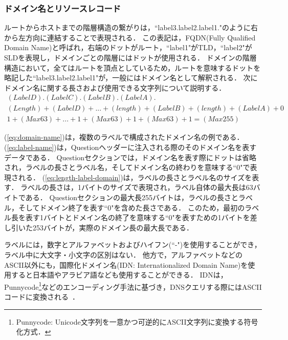 \subsubsection{ドメイン名とリソースレコード}
\label{sec:domain-resorce-record}
ルートからホストまでの階層構造の繋がりは，``label3.label2.label1."のように右から左方向に連結することで表現される．
この表記は，FQDN(Fully Qualified Domain Name)と呼ばれ，右端のドットがルート，``label1"がTLD，``label2"がSLDを表現し，ドメインごとの階層にはドットが使用される．
ドメインの階層構造において，全てはルートを頂点としているため，ルートを意味するドットを略記した``label3.label2.label1"が，一般にはドメイン名として解釈される．
次にドメイン名に関する長さおよび使用できる文字列について説明する．
\vspace{-1pt}
\begin{eqnarray}
 (LabelD).(LabelC).(LabelB).(LabelA). \label{eq:domain-name} \\
 (Length) + (LabelD) + ... + (length) + (LabelB) + (length) + (LabelA) + 0 \label{eq:label-name} \\ 
 1 + (Max 63) + ... + 1 + (Max 63) + 1 + (Max 63) + 1 = (Max 255) \label{eq:length-label-domain}
\end{eqnarray}

(\ref{eq:domain-name})は，複数のラベルで構成されたドメイン名の例である．
(\ref{eq:label-name})は，Questionヘッダーに注入される際のそのドメイン名を表すデータである．
Questionセクションでは，ドメイン名を表す際にドットは省略され，ラベルの長さとラベル名，そしてドメイン名の終わりを意味する``0"で表現される．
(\ref{eq:length-label-domain})は，ラベルの長さとラベル名のサイズを表す．
ラベルの長さは，1バイトのサイズで表現され，ラベル自体の最大長は63バイトである．
Questionセクションの最大長255バイトは，ラベルの長さとラベル，そしてドメイン終了を表す``0"を含めた長さである．
このため，最初のラベル長を表す1バイトとドメイン名の終了を意味する``0"を表すための1バイトを差し引いた253バイトが，実際のドメイン長の最大長である．

ラベルには，数字とアルファベットおよびハイフン(``-")を使用することができ，ラベル中に大文字・小文字の区別はない．
他方で，アルファベットなどのASCII以外にも，国際化ドメイン名(IDN: Internationalized Domain Name)を使用すると日本語やアラビア語なども使用することができる．
IDNは，Punnycode\footnote{Punnycode: Unicode文字列を一意かつ可逆的にASCII文字列に変換する符号化方式．}などのエンコーディング手法に基づき，DNSクエリする際にはASCIIコードに変換される~\cite{idn}．

